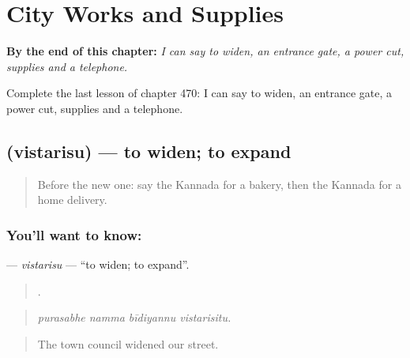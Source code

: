 
\chapter{City Works and Supplies}
\label{ch:ka-city-works-and-supplies}

\begin{chapteropening}
\textbf{By the end of this chapter:} \emph{I can say to widen, an entrance gate, a power cut, supplies and a telephone.}

Complete the last lesson of chapter 470: I can say to widen, an entrance gate, a power cut, supplies and a telephone.
\end{chapteropening}

\section[\texorpdfstring{\kn{ವಿಸ್ತರಿಸು} (vistarisu)}{ವಿಸ್ತರಿಸು (vistarisu)}]{ (vistarisu) — to widen; to expand}

\label{lesson:KA-C470-vistarisu}



\begin{quote}
Before the new one: say the Kannada for a bakery, then the Kannada for a home delivery.
\end{quote}

\subsection*{You'll want to know: }
\textbf{} — \emph{vistarisu} — \textquotedblleft{}to widen; to expand\textquotedblright{}.

\begin{quote}
   .
\end{quote}

\begin{quote}
\emph{purasabhe namma bīdiyannu vistarisitu.}
\end{quote}

\begin{quote}
The town council widened our street.
\end{quote}

